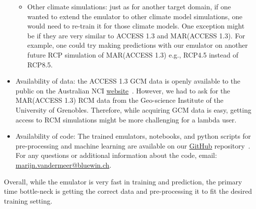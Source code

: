 \documentclass[a4paper,11pt,oneside]{report}
\begin{document}
\begin{itemize}
\begin{itemize}
        \item Other climate simulations: just as for another target domain, if one wanted to extend the emulator to other climate model simulations, one would need to re-train it for those climate models. One exception might be if they are very similar to ACCESS 1.3 and MAR(ACCESS 1.3). For example, one could try making predictions with our emulator on another future RCP simulation of MAR(ACCESS 1.3) e.g., RCP4.5 instead of RCP8.5.  
    \end{itemize}
    \item Availability of data: the ACCESS 1.3 GCM data is openly available to the public on the Australian NCI \href{https://esgf.nci.org.au/search/esgf-nci/}{website}~\cite{NCI}. However, we had to ask for the MAR(ACCESS 1.3) RCM data from the Geo-science Institute of the University of Grenobles. Therefore, while acquiring GCM data is easy, getting access to RCM simulations might be more challenging for a lambda user.
    \item Availability of code: The trained emulators, notebooks, and python scripts for pre-processing and machine learning are available on our \href{https://github.com/marvande/master-thesis}{GitHub} repository~\cite{GitHub}. For any questions or additional information about the code, email: \href{mailto:marijn.vandermeer@bluewin.ch}{marijn.vandermeer@bluewin.ch}. 
\end{itemize}
Overall, while the emulator is very fast in training and prediction, the primary time bottle-neck is getting the correct data and pre-processing it to fit the desired training setting.  


\end{document}
